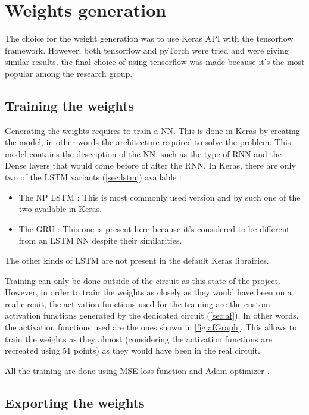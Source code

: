 \section{Weights generation}
\label{sec:weigen}

The choice for the weight generation was to use Keras API with the tensorflow framework. However, both tensorflow and pyTorch were tried and were giving similar results, the final choice of using tensorflow was made because it's the most popular among the research group.%

\subsection{Training the weights}

Generating the weights requires to train a \ac{NN}. This is done in Keras by creating the model, in other words the architecture required to solve the problem. This model contains the description of the \ac{NN}, such as the type of \ac{RNN} and the Dense layers that would come before of after the \ac{RNN}. In Keras, there are only two of the \ac{LSTM} variants (\cref{sec:lstm}) available :

\begin{itemize}
\item The \ac{NP} \ac{LSTM} : This is most commonly used version and by such one of the two available in Keras.
\item The \ac{GRU} : This one is present here because it's considered to be different from an \ac{LSTM} \ac{NN} despite their similarities.
\end{itemize}

The other kinds of \ac{LSTM} are not present in the default Keras librairies.

Training can only be done outside of the circuit as this state of the project. However, in order to train the weights as closely as they would have been on a real circuit, the activation functions used for the training are the custom activation functions generated by the dedicated circuit (\cref{sec:af}). In other words, the activation functions used are the ones shown in \cref{fig:afGraph}. This allows to train the weights as they almost (considering the activation functions are recreated using 51 points) as they would have been in the real circuit.

All the training are done using \ac{MSE} loss function and Adam optimizer \cite{adamOpti}.

\subsection{Exporting the weights}

